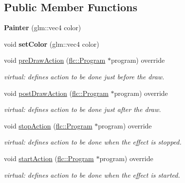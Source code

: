 \subsection*{Public Member Functions}
\begin{DoxyCompactItemize}
\item 
{\bfseries Painter} (glm\+::vec4 color)\hypertarget{classflw_1_1flf_1_1Painter_a4999a420255c4391e9d515abadcee395}{}\label{classflw_1_1flf_1_1Painter_a4999a420255c4391e9d515abadcee395}

\item 
void {\bfseries set\+Color} (glm\+::vec4 color)\hypertarget{classflw_1_1flf_1_1Painter_a5a682f895dec9a1fa7c6642116c2ed95}{}\label{classflw_1_1flf_1_1Painter_a5a682f895dec9a1fa7c6642116c2ed95}

\item 
void \hyperlink{classflw_1_1flf_1_1Painter_a92e72e8875c374e4fc118cbd9e003dd5}{pre\+Draw\+Action} (\hyperlink{classflw_1_1flc_1_1Program}{flc\+::\+Program} $\ast$program) override
\begin{DoxyCompactList}\small\item\em virtual\+: defines action to be done just before the draw. \end{DoxyCompactList}\item 
void \hyperlink{classflw_1_1flf_1_1Painter_a18960e396393ce9b3fd0d8cc91fc6864}{post\+Draw\+Action} (\hyperlink{classflw_1_1flc_1_1Program}{flc\+::\+Program} $\ast$program) override
\begin{DoxyCompactList}\small\item\em virtual\+: defines action to be done just after the draw. \end{DoxyCompactList}\item 
void \hyperlink{classflw_1_1flf_1_1Painter_a8ab637228dbefe1befaa92825507ad0e}{stop\+Action} (\hyperlink{classflw_1_1flc_1_1Program}{flc\+::\+Program} $\ast$program) override
\begin{DoxyCompactList}\small\item\em virtual\+: defines action to be done when the effect is stopped. \end{DoxyCompactList}\item 
void \hyperlink{classflw_1_1flf_1_1Painter_aa5104b3f3db56f13d93172203f6fa105}{start\+Action} (\hyperlink{classflw_1_1flc_1_1Program}{flc\+::\+Program} $\ast$program) override
\begin{DoxyCompactList}\small\item\em virtual\+: defines action to be done when the effect is started. \end{DoxyCompactList}\end{DoxyCompactItemize}


